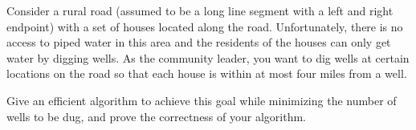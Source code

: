 \problem{}
Consider a rural road (assumed to be a long line segment with a left and right endpoint) with a set of houses located along the road.  Unfortunately, there is no access to piped water in this area and the residents of the houses can only get water by digging wells. As the community leader, you want to dig wells at certain locations on the road so that each house is within at most four miles from a well.

Give an efficient algorithm to achieve this goal while minimizing the number of wells to be dug, and prove the correctness of your algorithm.

 \solution{
 
 }
 
\newpage